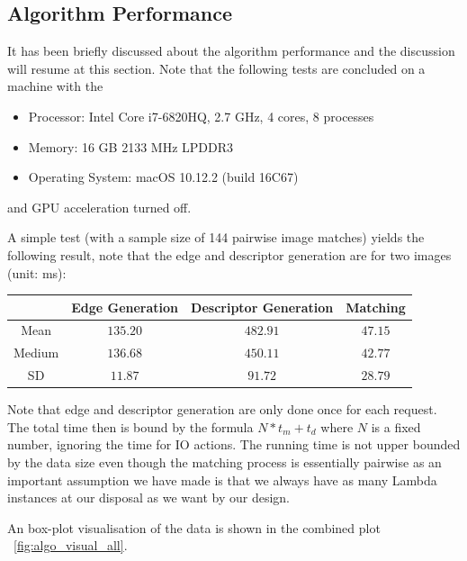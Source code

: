 \subsection{Algorithm Performance}
\label{sec:algorithm}

It has been briefly discussed about the algorithm performance and the discussion will resume at this section. Note that the following tests are concluded on a machine with the

\begin{itemize}
	\item Processor: Intel Core i7-6820HQ, 2.7 GHz, 4 cores, 8 processes
	\item Memory: 16 GB 2133 MHz LPDDR3
	\item Operating System: macOS 10.12.2 (build 16C67)
\end{itemize}

and GPU acceleration turned off.

A simple test (with a sample size of 144 pairwise image matches) yields the following result, note that the edge and descriptor generation are for two images (unit: ms):

\begin{center}
\begin{tabular}{c|c c c}
        & Edge Generation & Descriptor Generation & Matching \\
\hline
Mean    & $135.20$       & $482.91$              & $47.15$  \\
Medium  & $136.68$       & $450.11$              & $42.77$  \\
SD      & $11.87$        & $91.72$               & $28.79$
\end{tabular}
\end{center}

Note that edge and descriptor generation are only done once for each request. The total time then is bound by the formula $N * t_m + t_d$ where $N$ is a fixed number, ignoring the time for IO actions. The running time is not upper bounded by the data size even though the matching process is essentially pairwise as an important assumption we have made is that we always have as many Lambda instances at our disposal as we want by our design.

An box-plot visualisation of the data is shown in the combined plot ~\ref{fig:algo_visual_all}.

